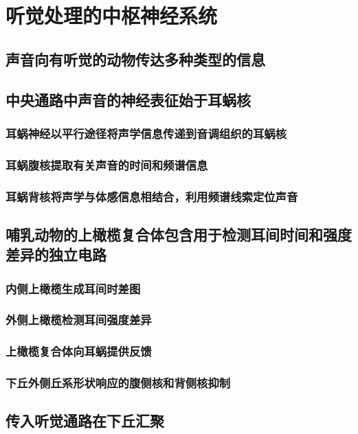 \chapter{听觉处理的中枢神经系统}

\section{声音向有听觉的动物传达多种类型的信息}

\section{中央通路中声音的神经表征始于耳蜗核}
\subsection{耳蜗神经以平行途径将声学信息传递到音调组织的耳蜗核}
\subsection{耳蜗腹核提取有关声音的时间和频谱信息}
\subsection{耳蜗背核将声学与体感信息相结合，利用频谱线索定位声音}

\section{哺乳动物的上橄榄复合体包含用于检测耳间时间和强度差异的独立电路}
\subsection{内侧上橄榄生成耳间时差图}
\subsection{外侧上橄榄检测耳间强度差异}
\subsection{上橄榄复合体向耳蜗提供反馈}
\subsection{下丘外侧丘系形状响应的腹侧核和背侧核抑制}

\section{传入听觉通路在下丘汇聚}
